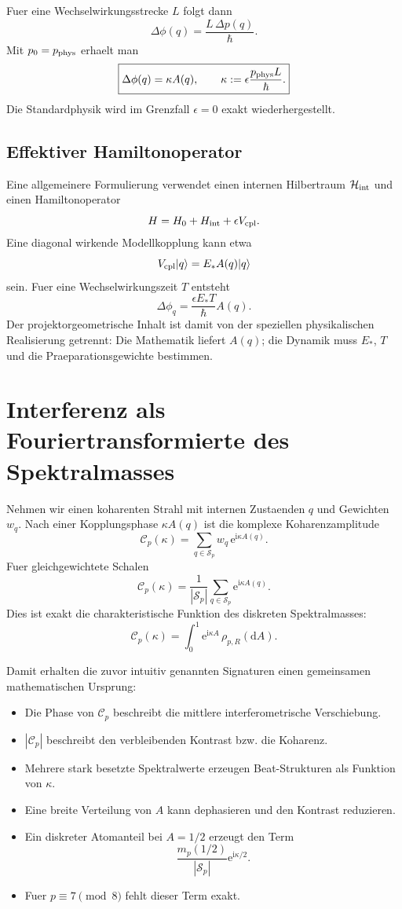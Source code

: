\documentclass[11pt,a4paper]{article}
\theoremstyle{definition}
\newcommand{\dd}{\mathrm d}
\newcommand{\ii}{\mathrm i}
\newcommand{\e}{\mathrm e}
\begin{document}
Fuer eine Wechselwirkungsstrecke $L$ folgt dann
\[
\Delta\phi(q)=\frac{L\,\Delta p(q)}{\hbar}.
\]
Mit $p_0=p_{\rm phys}$ erhaelt man
\[
\boxed{
\Delta\phi(q)=\kappa A(q),
\qquad
\kappa:=\epsilon\frac{p_{\rm phys}L}{\hbar}.}
\]
Die Standardphysik wird im Grenzfall $\epsilon=0$ exakt wiederhergestellt.

\subsection{Effektiver Hamiltonoperator}
Eine allgemeinere Formulierung verwendet einen internen Hilbertraum $\mathcal H_{\rm int}$ und einen Hamiltonoperator
\[
H=H_0+H_{\rm int}+\epsilon V_{\rm cpl}.
\]
Eine diagonal wirkende Modellkopplung kann etwa
\[
V_{\rm cpl}|q\rangle=E_*A(q)|q\rangle
\]
sein. Fuer eine Wechselwirkungszeit $T$ entsteht
\[
\Delta\phi_q=\frac{\epsilon E_*T}{\hbar}A(q).
\]
Der projektorgeometrische Inhalt ist damit von der speziellen physikalischen Realisierung getrennt: Die Mathematik liefert $A(q)$; die Dynamik muss $E_*$, $T$ und die Praeparationsgewichte bestimmen.

\section{Interferenz als Fouriertransformierte des Spektralmasses}
Nehmen wir einen koharenten Strahl mit internen Zustaenden $q$ und Gewichten $w_q$. Nach einer Kopplungsphase $\kappa A(q)$ ist die komplexe Koharenzamplitude
\[
\boxed{
\mathcal C_p(\kappa)
=\sum_{q\in\mathcal S_p}w_q\,\e^{\ii\kappa A(q)}.}
\]
Fuer gleichgewichtete Schalen
\[
\mathcal C_p(\kappa)
=\frac1{|\mathcal S_p|}
\sum_{q\in\mathcal S_p}\e^{\ii\kappa A(q)}.
\]
Dies ist exakt die charakteristische Funktion des diskreten Spektralmasses:
\[
\mathcal C_p(\kappa)
=\int_0^1\e^{\ii\kappa A}\,\rho_{p,R}(\dd A).
\]

Damit erhalten die zuvor intuitiv genannten Signaturen einen gemeinsamen mathematischen Ursprung:
\begin{itemize}[leftmargin=1.7em]
\item Die Phase von $\mathcal C_p$ beschreibt die mittlere interferometrische Verschiebung.
\item $|\mathcal C_p|$ beschreibt den verbleibenden Kontrast bzw. die Koharenz.
\item Mehrere stark besetzte Spektralwerte erzeugen Beat-Strukturen als Funktion von $\kappa$.
\item Eine breite Verteilung von $A$ kann dephasieren und den Kontrast reduzieren.
\item Ein diskreter Atomanteil bei $A=1/2$ erzeugt den Term
\[
\frac{m_p(1/2)}{|\mathcal S_p|}\e^{\ii\kappa/2}.
\]
\item Fuer $p\equiv7\pmod8$ fehlt dieser Term exakt.
\end{itemize}
\end{document}
